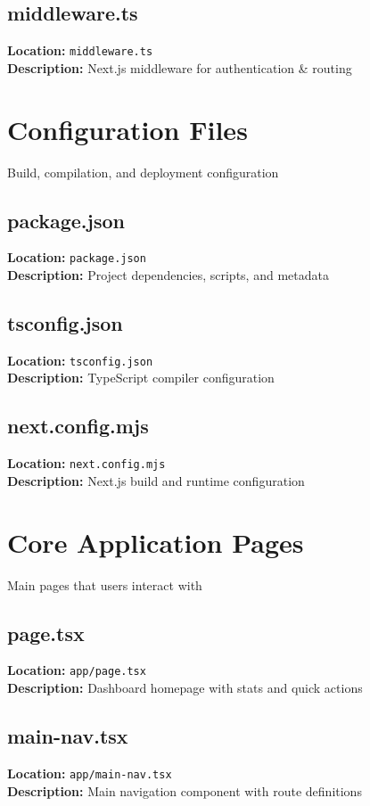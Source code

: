 \documentclass[11pt,twoside,openright]{book}
\newcommand{\filepath}[1]{\texttt{#1}}
\newcommand{\codesection}[3]{
    \section{#1}
    \textbf{Location:} \filepath{#2}\\
    \textbf{Description:} #3\\
}
\begin{document}


\clearpage


\codesection{middleware.ts}{middleware.ts}{Next.js middleware for authentication & routing}



\clearpage


\cleardoublepage
\chapter{Configuration Files}

Build, compilation, and deployment configuration


\codesection{package.json}{package.json}{Project dependencies, scripts, and metadata}



\clearpage


\codesection{tsconfig.json}{tsconfig.json}{TypeScript compiler configuration}



\clearpage


\codesection{next.config.mjs}{next.config.mjs}{Next.js build and runtime configuration}



\clearpage


\cleardoublepage
\chapter{Core Application Pages}

Main pages that users interact with


\codesection{page.tsx}{app/page.tsx}{Dashboard homepage with stats and quick actions}



\clearpage


\codesection{main-nav.tsx}{app/main-nav.tsx}{Main navigation component with route definitions}



\clearpage
\end{document}
